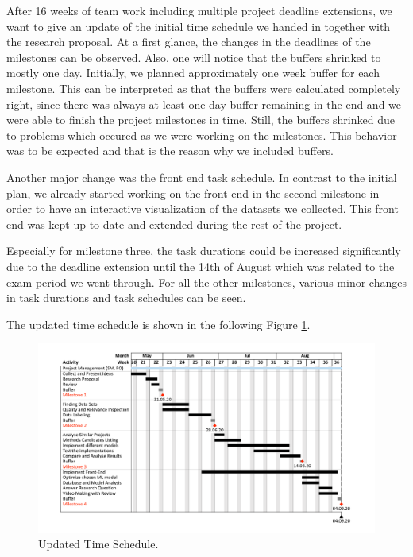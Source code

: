 	After 16 weeks of team work including multiple project deadline extensions, we want to give an update of the initial time schedule we handed in together with the research proposal. At a first glance, the changes in the deadlines of the milestones can be observed. Also, one will notice that the buffers shrinked to mostly one day. Initially, we planned approximately one week buffer for each milestone. This can be interpreted as that the buffers were calculated completely right, since there was always at least one day buffer remaining in the end and we were able to finish the project milestones in time. Still, the buffers shrinked due to problems which occured as we were working on the milestones. This behavior was to be expected and that is the reason why we included buffers. 
	
	Another major change was the front end task schedule. In contrast to the initial plan, we already started working on the front end in the second milestone in order to have an interactive visualization of the datasets we collected. This front end was kept up-to-date and extended during the rest of the project.
	
	Especially for milestone three, the task durations could be increased significantly due to the deadline extension until the 14th of August which was related to the exam period we went through. For all the other milestones, various minor changes in task durations and task schedules can be seen.
	
	The updated time schedule is shown in the following Figure \ref{fig:updated_time_schedule}.
	
	\begin{figure}[H]
		\centering
		\includegraphics[width=\textwidth]{img/updated_time_schedule}
		\caption{Updated Time Schedule.}
		\label{fig:updated_time_schedule}
	\end{figure}
	
	
